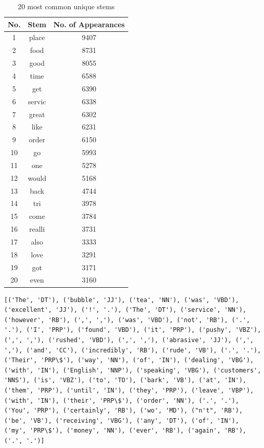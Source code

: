\begin{table}[!h]
	\tiny
	\centering
	\caption{20 most common unique stems}
	\begin{tabular}{c|c|c}
		No. & Stem & No. of Appearances  \\
		\hline
		1 & place & 9407 \\
		2 & food & 8731 \\
		3 & good & 8055 \\
		4 & time & 6588 \\
		5 & get & 6390 \\
		6 & servic & 6338 \\
		7 & great & 6302 \\
		8 & like & 6231 \\
		9 & order & 6150 \\
		10 & go & 5993 \\
		11 & one & 5278 \\
		12 & would & 5168 \\
		13 & back & 4744 \\
		14 & tri & 3978 \\
		15 & come & 3784 \\
		16 & realli & 3731 \\
		17 & also & 3333 \\
		18 & love & 3291 \\
		19 & got & 3171 \\
		20 & even & 3160\\
	\end{tabular}
\end{table}
\newpage
{}
\begin{Verbatim}[breaklines=true, breakanywhere=true]
[('The', 'DT'), ('bubble', 'JJ'), ('tea', 'NN'), ('was', 'VBD'), ('excellent', 'JJ'), ('!', '.'), ('The', 'DT'), ('service', 'NN'), ('however', 'RB'), (',', ','), ('was', 'VBD'), ('not', 'RB'), ('.', '.'), ('I', 'PRP'), ('found', 'VBD'), ('it', 'PRP'), ('pushy', 'VBZ'), (',', ','), ('rushed', 'VBD'), (',', ','), ('abrasive', 'JJ'), (',', ','), ('and', 'CC'), ('incredibly', 'RB'), ('rude', 'VB'), ('.', '.'), ('Their', 'PRP\$'), ('way', 'NN'), ('of', 'IN'), ('dealing', 'VBG'), ('with', 'IN'), ('English', 'NNP'), ('speaking', 'VBG'), ('customers', 'NNS'), ('is', 'VBZ'), ('to', 'TO'), ('bark', 'VB'), ('at', 'IN'), ('them', 'PRP'), ('until', 'IN'), ('they', 'PRP'), ('leave', 'VBP'), ('with', 'IN'), ('their', 'PRP\$'), ('order', 'NN'), ('.', '.'), ('You', 'PRP'), ('certainly', 'RB'), ('wo', 'MD'), ("n't", 'RB'), ('be', 'VB'), ('receiving', 'VBG'), ('any', 'DT'), ('of', 'IN'), ('my', 'PRP\$'), ('money', 'NN'), ('ever', 'RB'), ('again', 'RB'), ('.', '.')]
\end{Verbatim}

